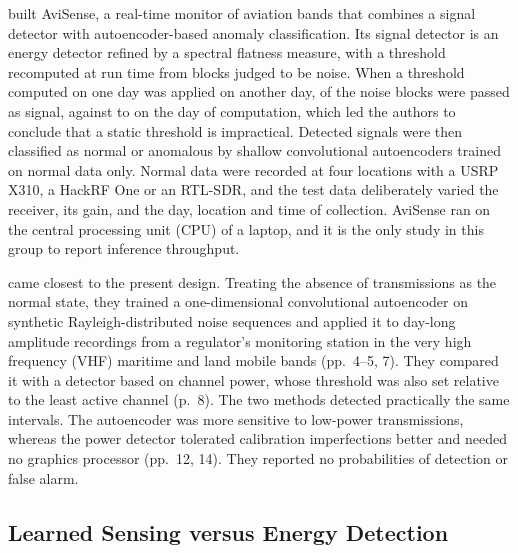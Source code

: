 \Textcite{baset2023} built AviSense, a real-time monitor of aviation bands that combines a signal detector with autoencoder-based anomaly classification. Its signal detector is an energy detector refined by a spectral flatness measure, with a threshold recomputed at run time from blocks judged to be noise. When a threshold computed on one day was applied on another day,  of the noise blocks were passed as signal, against  to  on the day of computation, which led the authors to conclude that a static threshold is impractical. Detected signals were then classified as normal or anomalous by shallow convolutional autoencoders trained on normal data only. Normal data were recorded at four locations with a USRP X310, a HackRF One or an RTL-SDR, and the test data deliberately varied the receiver, its gain, and the day, location and time of collection. AviSense ran on the central processing unit (CPU) of a laptop, and it is the only study in this group to report inference throughput.

\Textcite{torio2025} came closest to the present design. Treating the absence of transmissions as the normal state, they trained a one-dimensional convolutional autoencoder on synthetic Rayleigh-distributed noise sequences and applied it to day-long amplitude recordings from a regulator's monitoring station in the very high frequency (VHF) maritime and land mobile bands (pp.~4--5, 7). They compared it with a detector based on channel power, whose threshold was also set relative to the least active channel (p.~8). The two methods detected practically the same intervals. The autoencoder was more sensitive to low-power transmissions, whereas the power detector tolerated calibration imperfections better and needed no graphics processor (pp.~12, 14). They reported no probabilities of detection or false alarm.

\subsection{Learned Sensing versus Energy Detection}
\label{sec:related-ed}

